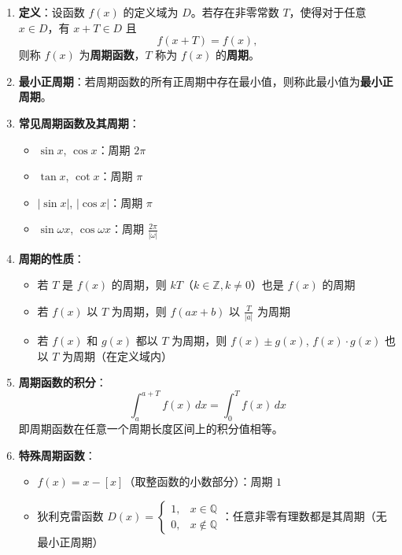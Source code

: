 \documentclass[../book.tex]{subfiles}
\begin{document}
    \begin{enumerate}
        \item \textbf{定义}：设函数 $f(x)$ 的定义域为 $D$。若存在非零常数 $T$，使得对于任意 $x \in D$，有 $x + T \in D$ 且
        \[
            f(x + T) = f(x),
        \]
        则称 $f(x)$ 为\textbf{周期函数}，$T$ 称为 $f(x)$ 的\textbf{周期}。

        \item \textbf{最小正周期}：若周期函数的所有正周期中存在最小值，则称此最小值为\textbf{最小正周期}。

        \item \textbf{常见周期函数及其周期}：
        \begin{itemize}
            \item $\sin x$, $\cos x$：周期 $2\pi$
            \item $\tan x$, $\cot x$：周期 $\pi$
            \item $|\sin x|$, $|\cos x|$：周期 $\pi$
            \item $\sin\omega x$, $\cos\omega x$：周期 $\displaystyle\frac{2\pi}{|\omega|}$
        \end{itemize}

        \item \textbf{周期的性质}：
        \begin{itemize}
            \item 若 $T$ 是 $f(x)$ 的周期，则 $kT$（$k \in \mathbb{Z}, k \neq 0$）也是 $f(x)$ 的周期
            \item 若 $f(x)$ 以 $T$ 为周期，则 $f(ax + b)$ 以 $\displaystyle\frac{T}{|a|}$ 为周期
            \item 若 $f(x)$ 和 $g(x)$ 都以 $T$ 为周期，则 $f(x) \pm g(x)$, $f(x) \cdot g(x)$ 也以 $T$ 为周期（在定义域内）
        \end{itemize}

        \item \textbf{周期函数的积分}：
        \[
            \int_a^{a+T} f(x)\,dx = \int_0^T f(x)\,dx
        \]
        即周期函数在任意一个周期长度区间上的积分值相等。

        \item \textbf{特殊周期函数}：
        \begin{itemize}
            \item $f(x) = x - [x]$（取整函数的小数部分）：周期 $1$
            \item 狄利克雷函数 $D(x) = \begin{cases}
                                           1, & x \in \mathbb{Q} \\ 0, & x \notin \mathbb{Q}
            \end{cases}$：任意非零有理数都是其周期（无最小正周期）
        \end{itemize}
    \end{enumerate}
\end{document}
